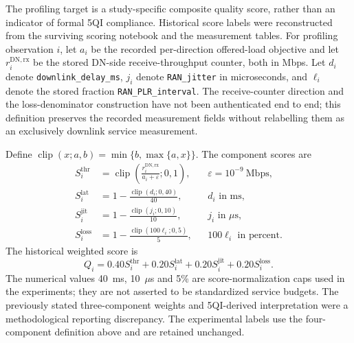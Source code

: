 
The profiling target is a study-specific composite quality score, rather than
an indicator of formal 5QI compliance. Historical score labels were reconstructed
from the surviving scoring notebook and the measurement tables. For profiling
observation $i$, let $a_i$ be the recorded per-direction offered-load objective
and let $r_i^{
\mathrm{DN,rx}}$ be the stored DN-side receive-throughput counter, both in Mbps.
Let $d_i$ denote \texttt{downlink\_delay\_ms}, $j_i$ denote
\texttt{RAN\_jitter} in microseconds, and $\ell_i$ denote the stored fraction
\texttt{RAN\_PLR\_interval}. The receive-counter direction and the loss-denominator
construction have not been authenticated end to end; this definition preserves
the recorded measurement fields without relabelling them as an exclusively
downlink service measurement.

Define $\operatorname{clip}(x;a,b)=\min\{b,\max\{a,x\}\}$. The component scores are
\begin{align}
 S_i^{\mathrm{thr}} & = \operatorname{clip}\!\left(
       \frac{r_i^{\mathrm{DN,rx}}}{a_i+\varepsilon};0,1\right),
       &&\varepsilon=10^{-9}\ \mathrm{Mbps}, \nonumber\\
 S_i^{\mathrm{lat}} & =1-\frac{\operatorname{clip}(d_i;0,40)}{40},
       &&d_i\text{ in ms}, \nonumber\\
 S_i^{\mathrm{jit}} & =1-\frac{\operatorname{clip}(j_i;0,10)}{10},
       &&j_i\text{ in }\mu\mathrm{s}, \nonumber\\
 S_i^{\mathrm{loss}} & =1-\frac{\operatorname{clip}(100\ell_i;0,5)}{5},
       &&100\ell_i\text{ in percent}.
 \label{eq:qos_components_recovered}
\end{align}
The historical weighted score is
\begin{equation}
 Q_i=0.40S_i^{\mathrm{thr}}+0.20S_i^{\mathrm{lat}}
       +0.20S_i^{\mathrm{jit}}+0.20S_i^{\mathrm{loss}}.
 \label{eq:qos_weighted}
\end{equation}
The numerical values 40~ms, 10~$\mu$s and 5\% are score-normalization caps used
in the experiments; they are not asserted to be standardized service budgets.
The previously stated three-component weights and 5QI-derived interpretation
were a methodological reporting discrepancy. The experimental labels use the
four-component definition above and are retained unchanged.

